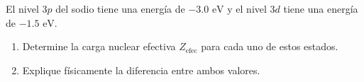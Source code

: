 \item El nivel $3p$ del sodio tiene una energía de $-3.0\text{ eV}$ y el nivel $3d$ tiene una energía de $-1.5\text{ eV}$.
\begin{enumerate}
    \item Determine la carga nuclear efectiva $Z_{\text{efec}}$ para cada uno de estos estados.
    \item Explique físicamente la diferencia entre ambos valores.
\end{enumerate}